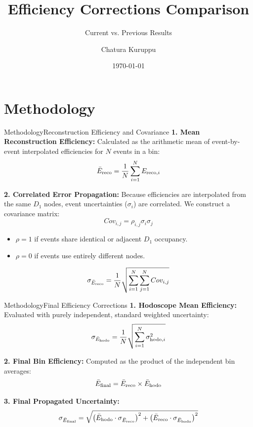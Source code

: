 \documentclass[aspectratio=169]{beamer}
\title{Efficiency Corrections Comparison}
\subtitle{Current vs. Previous Results}
\author{Chatura Kuruppu}
\institute{Department of Physics \\ New Mexico State University}
\date{\today}
\begin{document}
\begin{frame}
    \titlepage
\end{frame}

\section{Methodology}

\begin{frame}{Methodology}{Reconstruction Efficiency and Covariance}
    \textbf{1. Mean Reconstruction Efficiency:}
    Calculated as the arithmetic mean of event-by-event interpolated efficiencies for $N$ events in a bin:
    \begin{equation*}
        \bar{E}_{\rm reco} = \frac{1}{N} \sum_{i=1}^{N} E_{{\rm reco}, i}
    \end{equation*}
    
    \vspace{0.3cm}
    \textbf{2. Correlated Error Propagation:}
    Because efficiencies are interpolated from the same $D_1$ nodes, event uncertainties ($\sigma_i$) are correlated. We construct a covariance matrix:
    \begin{equation*}
        Cov_{i,j} = \rho_{i,j} \sigma_i \sigma_j
    \end{equation*}
    \begin{itemize}
        \item $\rho = 1$ if events share identical or adjacent $D_1$ occupancy.
        \item $\rho = 0$ if events use entirely different nodes.
    \end{itemize}
    \begin{equation*}
        \sigma_{\bar{E}_{\rm reco}} = \frac{1}{N} \sqrt{ \sum_{i=1}^{N} \sum_{j=1}^{N} Cov_{i,j} }
    \end{equation*}
\end{frame}

\begin{frame}{Methodology}{Final Efficiency Corrections}
    \textbf{1. Hodoscope Mean Efficiency:}
    Evaluated with purely independent, standard weighted uncertainty:
    \begin{equation*}
        \sigma_{\bar{E}_{\rm hodo}} = \frac{1}{N} \sqrt{ \sum_{i=1}^{N} \sigma_{{\rm hodo}, i}^2 }
    \end{equation*}
    
    \vspace{0.3cm}
    \textbf{2. Final Bin Efficiency:}
    Computed as the product of the independent bin averages:
    \begin{equation*}
        \bar{E}_{\rm final} = \bar{E}_{\rm reco} \times \bar{E}_{\rm hodo}
    \end{equation*}
    
    \vspace{0.3cm}
    \textbf{3. Final Propagated Uncertainty:}
    \begin{equation*}
        \sigma_{\bar{E}_{\rm final}} = \sqrt{ \left(\bar{E}_{\rm hodo} \cdot \sigma_{\bar{E}_{\rm reco}}\right)^2 + \left(\bar{E}_{\rm reco} \cdot \sigma_{\bar{E}_{\rm hodo}}\right)^2 }
    \end{equation*}
\end{frame}
\end{document}
